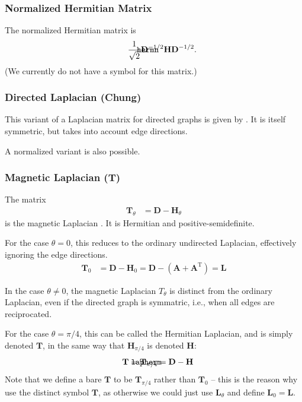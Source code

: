 \documentclass{article}
\def\mathnote#1{%
  \tag*{\rlap{\hspace\marginparsep\smash{\parbox[t]{\marginparwidth}{#1}}}}
}
\begin{document}
\subsubsection{Normalized Hermitian Matrix}
The normalized Hermitian matrix is
\begin{align}
  \mathnote{\texttt{hermn}}
  \frac 1{\sqrt 2} \mathbf D^{-1/2} \mathbf H \mathbf D^{-1/2}. 
\end{align}
(We currently do not have a symbol for this matrix.)

\subsubsection{Directed Laplacian (Chung)}
This variant of a Laplacian matrix for directed graphs is given by
\cite{b264}.  It is itself symmetric, but takes into account edge
directions. 

A normalized variant is also possible.  

\subsubsection{Magnetic Laplacian ($\mathbf T$)}
The matrix
\begin{align}
  \mathbf T_{\theta} &= \mathbf D - \mathbf H_{\theta} 
\end{align}
is the magnetic Laplacian \citep{b903}.  It is Hermitian and positive-semidefinite.   

For the case $\theta = 0$, this reduces to the ordinary undirected
Laplacian, effectively ignoring the edge directions.
\begin{align}
  \mathbf T_{0} &= \mathbf D - \mathbf H_{0} = \mathbf D - (\mathbf A + \mathbf A^{\mathrm T}) = \mathbf L
\end{align}

In the case $\theta \neq 0$, the magnetic Laplacian $T_{\theta}$ is
distinct from the ordinary Laplacian, even if the directed graph is
symmatric, i.e., when all edges are reciprocated. 

For the case $\theta = \pi/4$, this can be called the Hermitian
Laplacian, and is simply denoted $\mathbf T$, in the same way that
$\mathbf H_{\pi/4}$ is denoted $\mathbf H$:
\begin{align}
  \mathnote{\texttt{lapherm}}
  \mathbf T &= \mathbf T_{\pi/4} = \mathbf D - \mathbf H
\end{align}
Note that we define a bare $\mathbf T$ to be $\mathbf T_{\pi/4}$ rather
than $\mathbf T_0$ -- this is the reason why use the distinct symbol
$\mathbf T$, as otherwise we could just use $\mathbf L_{\theta}$ and define
$\mathbf L_0 = \mathbf L$. 
\end{document}

